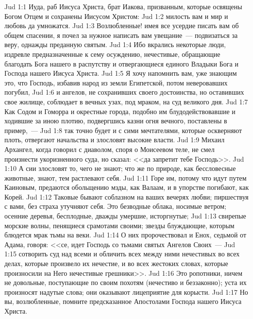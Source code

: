 \vs Jud 1:1 Иуда, раб Иисуса Христа, брат Иакова, призванным, которые освящены Богом Отцем и сохранены Иисусом Христом:
\vs Jud 1:2 милость вам и мир и любовь да умножатся.
\rsbpar\vs Jud 1:3 Возлюбленные! имея все усердие писать вам об общем спасении, я почел за нужное написать вам увещание~--- подвизаться за веру, однажды преданную святым.
\vs Jud 1:4 Ибо вкрались некоторые люди, издревле предназначенные к сему осуждению, нечестивые, обращающие благодать Бога нашего в  распутству и отвергающиеся единого Владыки Бога и Господа нашего Иисуса Христа.
\rsbpar\vs Jud 1:5 Я хочу напомнить вам, уже знающим это, что Господь, избавив народ из земли Египетской, потом неверовавших погубил,
\vs Jud 1:6 и ангелов, не сохранивших своего достоинства, но оставивших свое жилище, соблюдает в вечных узах, под мраком, на суд великого дня.
\vs Jud 1:7 Как Содом и Гоморра и окрестные города, подобно им блудодействовавшие и ходившие за иною плотию, подвергшись казни огня вечного, поставлены в пример,~---
\vs Jud 1:8 так точно будет и с сими мечтателями, которые оскверняют плоть, отвергают начальства и злословят высокие власти.
\vs Jud 1:9 Михаил Архангел, когда говорил с диаволом, споря о Моисеевом теле, не смел произнести укоризненного суда, но сказал: <<да запретит тебе Господь>>.
\vs Jud 1:10 А сии злословят то, чего не знают; что же по природе, как бессловесные животные, знают, тем растлевают себя.
\vs Jud 1:11 Горе им, потому что идут путем Каиновым, предаются обольщению мзды, как Валаам, и в упорстве погибают, как Корей.
\vs Jud 1:12 Таковые бывают соблазном на ваших вечерях любви; пиршествуя с вами, без страха утучняют себя. Это безводные облака, носимые ветром; осенние деревья, бесплодные, дважды умершие, исторгнутые;
\vs Jud 1:13 свирепые морские волны, пенящиеся срамотами своими; звезды блуждающие, которым блюдется мрак тьмы на веки.
\vs Jud 1:14 О них пророчествовал и Енох, седьмой от Адама, говоря: <<се, идет Господь со тьмами святых Ангелов Своих~---
\vs Jud 1:15 сотворить суд над всеми и обличить всех между ними нечестивых во всех делах, которые произвело их нечестие, и во всех жестоких словах, которые произносили на Него нечестивые грешники>>.
\vs Jud 1:16 Это ропотники, ничем не довольные, поступающие по своим похотям (нечестиво и беззаконно); уста их произносят надутые слова; они оказывают лицеприятие для корысти.
\vs Jud 1:17 Но вы, возлюбленные, помните предсказанное Апостолами Господа нашего Иисуса Христа.
